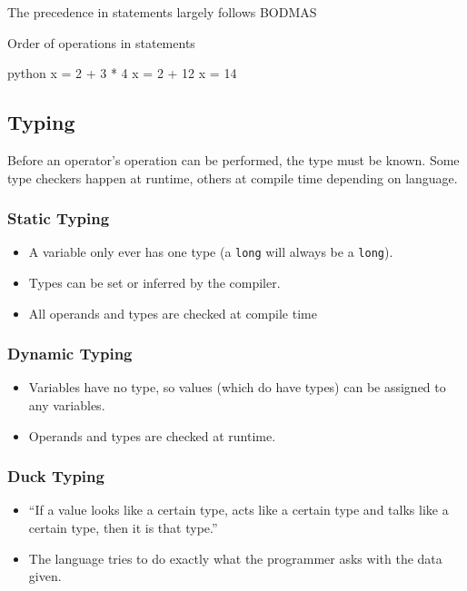 The precedence in statements largely follows BODMAS

\begin{highlight}{Order of operations in statements}
	\begin{code}{python}
		x = 2 + 3 * 4
		x = 2 + 12
		x = 14
	\end{code}
\end{highlight}

\subsection{Typing}\label{sub:typing}

Before an operator's operation can be performed, the type must be known.
Some type checkers happen at runtime, others at compile time depending on language.

\subsubsection{Static Typing}\label{ssub:static-typing}

\begin{itemize}
	\item A variable only ever has one type (a \texttt{long} will always be a \texttt{long}).
	\item Types can be set or inferred by the compiler.
	\item All operands and types are checked at compile time
\end{itemize}

\subsubsection{Dynamic Typing}\label{ssub:dynamic-typing}

\begin{itemize}
	\item Variables have no type, so values (which do have types) can be assigned to any variables.
	\item Operands and types are checked at runtime.
\end{itemize}

\subsubsection{Duck Typing}\label{ssub:duck-typing}

\begin{itemize}
	\item ``If a value looks like a certain type, acts like a certain type and talks like a certain type, then it is that type.''
	\item The language tries to do exactly what the programmer asks with the data given.
\end{itemize}

